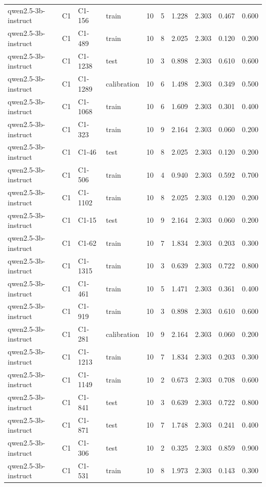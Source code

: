 \begin{table}
\begin{tabular}{llllrrrrrr}
qwen2.5-3b-instruct & C1 & C1-156 & train & 10 & 5 & 1.228 & 2.303 & 0.467 & 0.600 \\
qwen2.5-3b-instruct & C1 & C1-489 & train & 10 & 8 & 2.025 & 2.303 & 0.120 & 0.200 \\
qwen2.5-3b-instruct & C1 & C1-1238 & test & 10 & 3 & 0.898 & 2.303 & 0.610 & 0.600 \\
qwen2.5-3b-instruct & C1 & C1-1289 & calibration & 10 & 6 & 1.498 & 2.303 & 0.349 & 0.500 \\
qwen2.5-3b-instruct & C1 & C1-1068 & train & 10 & 6 & 1.609 & 2.303 & 0.301 & 0.400 \\
qwen2.5-3b-instruct & C1 & C1-323 & train & 10 & 9 & 2.164 & 2.303 & 0.060 & 0.200 \\
qwen2.5-3b-instruct & C1 & C1-46 & test & 10 & 8 & 2.025 & 2.303 & 0.120 & 0.200 \\
qwen2.5-3b-instruct & C1 & C1-506 & train & 10 & 4 & 0.940 & 2.303 & 0.592 & 0.700 \\
qwen2.5-3b-instruct & C1 & C1-1102 & train & 10 & 8 & 2.025 & 2.303 & 0.120 & 0.200 \\
qwen2.5-3b-instruct & C1 & C1-15 & test & 10 & 9 & 2.164 & 2.303 & 0.060 & 0.200 \\
qwen2.5-3b-instruct & C1 & C1-62 & train & 10 & 7 & 1.834 & 2.303 & 0.203 & 0.300 \\
qwen2.5-3b-instruct & C1 & C1-1315 & train & 10 & 3 & 0.639 & 2.303 & 0.722 & 0.800 \\
qwen2.5-3b-instruct & C1 & C1-461 & train & 10 & 5 & 1.471 & 2.303 & 0.361 & 0.400 \\
qwen2.5-3b-instruct & C1 & C1-919 & train & 10 & 3 & 0.898 & 2.303 & 0.610 & 0.600 \\
qwen2.5-3b-instruct & C1 & C1-281 & calibration & 10 & 9 & 2.164 & 2.303 & 0.060 & 0.200 \\
qwen2.5-3b-instruct & C1 & C1-1213 & train & 10 & 7 & 1.834 & 2.303 & 0.203 & 0.300 \\
qwen2.5-3b-instruct & C1 & C1-1149 & train & 10 & 2 & 0.673 & 2.303 & 0.708 & 0.600 \\
qwen2.5-3b-instruct & C1 & C1-841 & test & 10 & 3 & 0.639 & 2.303 & 0.722 & 0.800 \\
qwen2.5-3b-instruct & C1 & C1-871 & test & 10 & 7 & 1.748 & 2.303 & 0.241 & 0.400 \\
qwen2.5-3b-instruct & C1 & C1-306 & test & 10 & 2 & 0.325 & 2.303 & 0.859 & 0.900 \\
qwen2.5-3b-instruct & C1 & C1-531 & train & 10 & 8 & 1.973 & 2.303 & 0.143 & 0.300 \\

\end{tabular}
\end{table}
